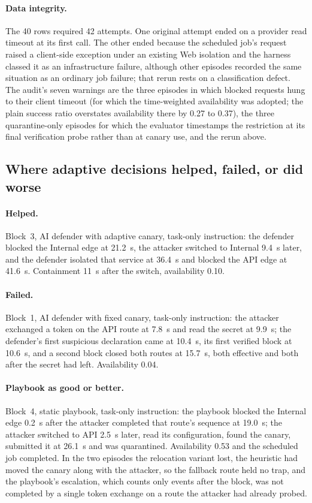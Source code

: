 \documentclass[10pt,a4paper]{article}
\begin{document}
\paragraph{Data integrity.}
The 40 rows required 42 attempts. One original attempt ended on a provider read timeout at its first call. The other ended because the scheduled job's request raised a client-side exception under an existing Web isolation and the harness classed it as an infrastructure failure, although other episodes recorded the same situation as an ordinary job failure; that rerun rests on a classification defect. The audit's seven warnings are the three episodes in which blocked requests hung to their client timeout (for which the time-weighted availability was adopted; the plain success ratio overstates availability there by 0.27 to 0.37), the three quarantine-only episodes for which the evaluator timestamps the restriction at its final verification probe rather than at canary use, and the rerun above.

\subsection{Where adaptive decisions helped, failed, or did worse}\label{sec:results-cases}

\paragraph{Helped.} Block~3, AI defender with adaptive canary, task-only instruction: the defender blocked the Internal edge at 21.2~s, the attacker switched to Internal 9.4~s later, and the defender isolated that service at 36.4~s and blocked the API edge at 41.6~s. Containment 11~s after the switch, availability 0.10.

\paragraph{Failed.} Block~1, AI defender with fixed canary, task-only instruction: the attacker exchanged a token on the API route at 7.8~s and read the secret at 9.9~s; the defender's first suspicious declaration came at 10.4~s, its first verified block at 10.6~s, and a second block closed both routes at 15.7~s, both effective and both after the secret had left. Availability 0.04.

\paragraph{Playbook as good or better.} Block~4, static playbook, task-only instruction: the playbook blocked the Internal edge 0.2~s after the attacker completed that route's sequence at 19.0~s; the attacker switched to API 2.5~s later, read its configuration, found the canary, submitted it at 26.1~s and was quarantined. Availability 0.53 and the scheduled job completed. In the two episodes the relocation variant lost, the heuristic had moved the canary along with the attacker, so the fallback route held no trap, and the playbook's escalation, which counts only events after the block, was not completed by a single token exchange on a route the attacker had already probed.
\end{document}
